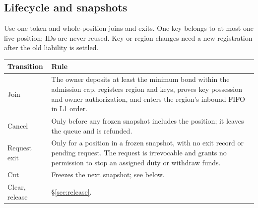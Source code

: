 \documentclass[11pt,a4paper]{article}
\begin{document}
\subsection{Lifecycle and snapshots}
\label{sec:lifecycle}
Use one token and whole-position joins and exits. One key belongs to at
most one live position; IDs are never reused. Key or region changes need
a new registration after the old liability is settled.

\begin{center}
\end{center}

\begin{tabularx}{\linewidth}{@{}>{\raggedright\arraybackslash}p{.15\linewidth}Y@{}}\toprule
Transition & Rule\\\midrule
Join & The owner deposits at least the minimum bond within the admission
cap, registers region and keys, proves key possession and owner
authorization, and enters the region's inbound FIFO in L1 order.\\
Cancel & Only before any frozen snapshot includes the position; it
leaves the queue and is refunded.\\
Request exit & Only for a position in a frozen snapshot, with no exit
record or pending request. The request is irrevocable and grants no
permission to stop an assigned duty or withdraw funds.\\
Cut & Freezes the next snapshot; see below.\\
Clear, release & \S\ref{sec:release}.\\\bottomrule
\end{tabularx}
\end{document}
